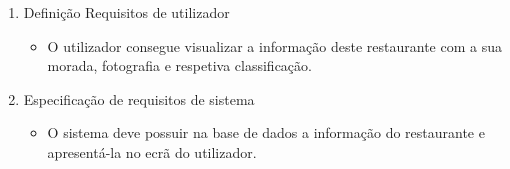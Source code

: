 \begin{enumerate}
    \item Definição Requisitos de utilizador
    \begin{itemize}
        \item O utilizador consegue visualizar a informação deste restaurante com a sua morada, fotografia e respetiva classificação.
    \end{itemize}
    \item Especificação de requisitos de sistema
    \begin{itemize}
        \item O sistema deve possuir na base de dados a informação do restaurante e apresentá-la no ecrã do utilizador.
    \end{itemize}
\end{enumerate}